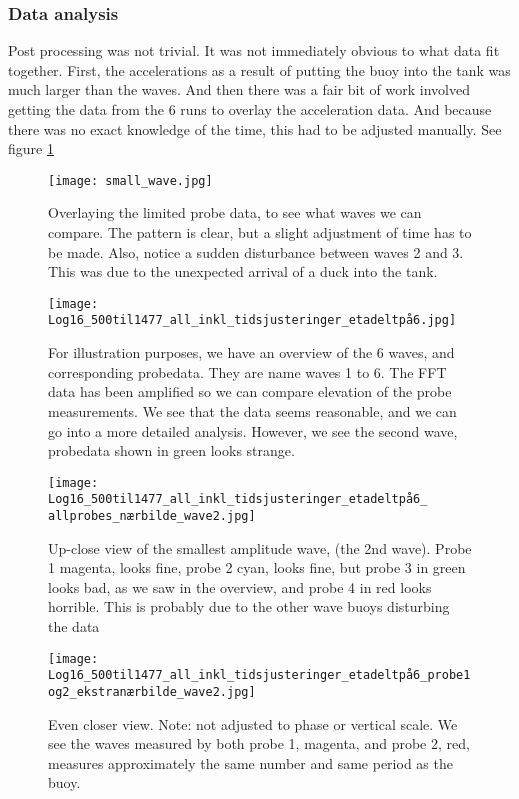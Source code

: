 \subsubsection{Data analysis}
Post processing was not trivial. It was not immediately obvious to what data fit together. First, the accelerations as a result of putting the buoy into the tank was much larger than the waves.  And then there was a fair bit of work involved getting the data from the 6 runs to overlay the acceleration data. And because there was no exact knowledge of the time, this had to be adjusted manually. See figure \ref{fig:find}

\begin{figure}[h!]%
    \centering
    \texttt{[image: small\_wave.jpg]}
    \caption{Overlaying the limited probe data, to see what waves we can compare. The pattern is clear, but a slight adjustment of time has to be made. Also, notice a sudden disturbance between waves 2 and 3. This was due to the unexpected arrival of a duck into the tank.} \label{fig:find}
\end{figure}



\begin{figure}[ht] 
    \centering
    \texttt{[image: Log16\_500til1477\_all\_inkl\_tidsjusteringer\_etadeltpå6.jpg]}
    \caption{For illustration purposes, we have an overview of the 6 waves, and corresponding probedata. They are name waves 1 to 6. The FFT data has been amplified so we can compare elevation of the probe measurements. We see that the data seems reasonable, and we can go into a more detailed analysis. However, we see the second wave, probedata shown in green looks strange.}
    \label{fig:}
\end{figure}
\begin{figure}[h!] 
    \centering
    \texttt{[image: Log16\_500til1477\_all\_inkl\_tidsjusteringer\_etadeltpå6\_ allprobes\_nærbilde\_wave2.jpg]}
    \caption{Up-close view of the smallest amplitude wave, (the 2nd wave). Probe 1 magenta, looks fine, probe 2 cyan, looks fine, but probe 3 in green looks bad, as we saw in the overview, and probe 4 in red looks horrible. This is probably due to the other wave buoys disturbing the data }
    \label{fig:}
\end{figure}
\begin{figure}[h!] 
    \centering
    \texttt{[image: Log16\_500til1477\_all\_inkl\_tidsjusteringer\_etadeltpå6\_probe1og2\_ekstranærbilde\_wave2.jpg]}
    \caption{Even closer view. Note: not adjusted to phase or vertical scale. We see the waves measured by both probe 1, magenta, and probe 2, red, measures approximately the same number and same period as the buoy. }
    \label{fig:}
\end{figure}

